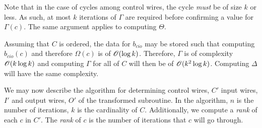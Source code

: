 Note that in the case of cycles among control wires, the cycle \emph{must} be
of size $k$ or less. As such, at most $k$ iterations of $\Gamma$ are required
before confirming a value for $\Gamma(c)$. The same argument applies to
computing $\Theta$.

Assuming that $C$ is ordered, the data for $b_{cio}$ may be stored such that
computing $b_{cio}(c)$ and therefore $\Omega(c)$ is of $\mathscr{O}({\log k})$.
Therefore, $\Gamma$ is of complexity $\mathscr{O}({k\log k})$ and computing
$\Gamma$ for all of $C$ will then be of $\mathscr{O}({k^2 \log k})$. Computing
$\Delta$ will have the same complexity.

We may now describe the  algorithm for determining control wires, $C'$
input wires, $I'$ and output wires, $O'$ of the transformed subroutine.
In the algorithm, $n$ is the number of iterations, $k$ is the cardinality
of $C$. Additionally, we compute a \emph{rank} of each $c$ in $C'$. The
\emph{rank} of $c$ is the number of iterations that $c$ will go through.
